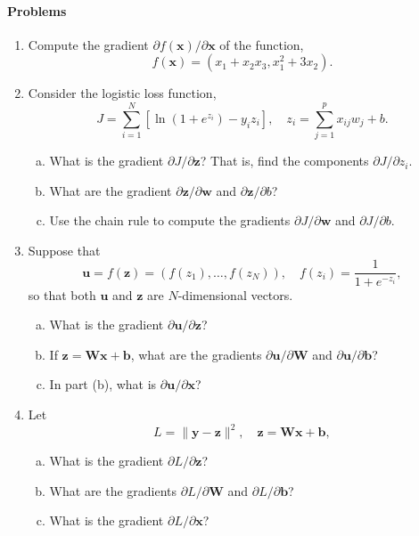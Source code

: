 \documentclass[11pt]{article}
\newcommand{\bbf}{\mathbf{b}}
\newcommand{\ubf}{\mathbf{u}}
\newcommand{\wbf}{\mathbf{w}}
\newcommand{\xbf}{\mathbf{x}}
\newcommand{\ybf}{\mathbf{y}}
\newcommand{\zbf}{\mathbf{z}}
\newcommand{\Wbf}{\mathbf{W}}
\begin{document}
\paragraph*{Problems}
\begin{enumerate}
\item Compute the gradient $\partial f(\xbf)/\partial \xbf$ of the function,
\[
    f(\xbf) = (x_1+x_2x_3,x_1^2+3x_2).
\]

\item Consider the logistic loss function,
\[
      J = \sum_{i=1}^N\left[ \ln(1+e^{z_i}) - y_iz_i \right], \quad z_i = \sum_{j=1}^p x_{ij}w_j + b.
\]
\begin{enumerate}[(a)]
\item What is the gradient $\partial J/\partial \zbf$?  That is, find the components $\partial J/\partial z_i$.
\item What are the gradient $\partial \zbf/\partial \wbf$ and $\partial \zbf/\partial b$?
\item Use the chain rule to compute the gradients $\partial J/\partial \wbf$ and $\partial J/\partial b$.
\end{enumerate}

\item Suppose that
\[
    \ubf = f(\zbf) = (f(z_1),\ldots,f(z_N)), \quad f(z_i) = \frac{1}{1+e^{-z_i}},
\]
so that both $\ubf$ and $\zbf$ are $N$-dimensional vectors.
\begin{enumerate}[(a)]
\item What is the gradient $\partial \ubf/\partial \zbf$?
\item If $\zbf = \Wbf\xbf + \bbf$, what are the gradients $\partial \ubf/\partial \Wbf$ and
$\partial \ubf/\partial \bbf$?
\item In part (b), what is $\partial \ubf/\partial \xbf$?
\end{enumerate}

\item Let
\[
    L = \|\ybf -\zbf\|^2, \quad \zbf = \Wbf\xbf+\bbf,
\]
\begin{enumerate}[(a)]
\item What is the gradient $\partial L/\partial \zbf$?
\item What are the gradients $\partial L/\partial \Wbf$ and $\partial L/\partial \bbf$?
\item What is the gradient $\partial L/\partial \xbf$?
\end{enumerate}
\end{enumerate}
\end{document}
